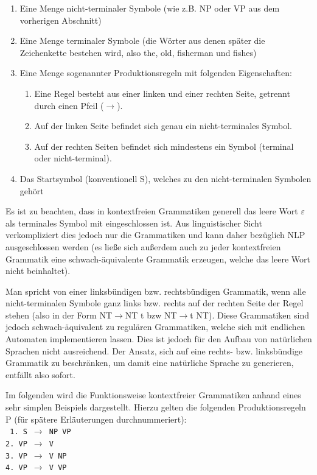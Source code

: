 \documentclass[12pt]{report}
\begin{document}
\begin{enumerate}
\item Eine Menge nicht-terminaler Symbole (wie z.B. NP oder VP aus dem vorherigen Abschnitt)
\item Eine Menge terminaler Symbole (die Wörter aus denen später die Zeichenkette bestehen wird, also \glqq  the\grqq{}, \glqq  old\grqq{}, \glqq  fisherman\grqq{} und \glqq  fishes\grqq{})
\item Eine Menge sogenannter Produktionsregeln mit folgenden Eigenschaften:
\begin{enumerate}
\item Eine Regel besteht aus einer linken und einer rechten Seite, getrennt durch einen Pfeil ($\rightarrow$).
\item Auf der linken Seite befindet sich genau ein nicht-terminales Symbol.
\item Auf der rechten Seiten befindet sich mindestens ein Symbol (terminal oder nicht-terminal).
\end{enumerate}
\item Das Startsymbol (konventionell \glqq  S\grqq{}), welches zu den nicht-terminalen Symbolen gehört
\end{enumerate}

Es ist zu beachten, dass in kontextfreien Grammatiken generell das leere Wort $\varepsilon$ als terminales Symbol mit eingeschlossen ist. Aus linguistischer Sicht verkompliziert dies jedoch nur die Grammatiken und kann daher bezüglich NLP ausgeschlossen werden (es ließe sich außerdem auch zu jeder kontextfreien Grammatik eine schwach-äquivalente Grammatik erzeugen, welche das leere Wort nicht beinhaltet).

Man spricht von einer linksbündigen bzw. rechtsbündigen Grammatik, wenn alle nicht-terminalen Symbole ganz links bzw. rechts auf der rechten Seite der Regel stehen (also in der Form \glqq  NT$\rightarrow$NT t\grqq{} bzw \glqq  NT$\rightarrow$t NT\grqq{}). Diese Grammatiken sind jedoch schwach-äquivalent zu regulären Grammatiken, welche sich mit endlichen Automaten implementieren lassen. Dies ist jedoch für den Aufbau von natürlichen Sprachen nicht ausreichend. Der Ansatz, sich auf eine rechts- bzw. linksbündige Grammatik zu beschränken, um damit eine natürliche Sprache zu generieren, entfällt also sofort. 

Im folgenden wird die Funktionsweise kontextfreier Grammatiken anhand eines sehr simplen Beispiels dargestellt. Hierzu gelten die folgenden Produktionsregeln P (für spätere Erläuterungen durchnummeriert):
\newline
\\
\tt
1. S $\rightarrow$ NP VP\\
2. VP $\rightarrow$ V\\
3. VP $\rightarrow$ V NP\\
4. VP $\rightarrow$ V VP\\
\end{document}
